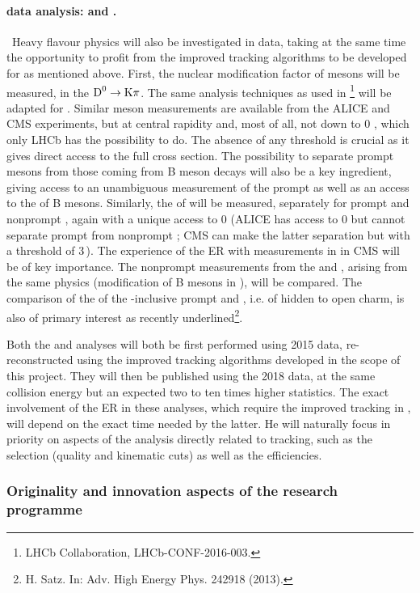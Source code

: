 \documentclass[a4paper,11pt]{article}
\newcommand{\ER}{ER\xspace}
\begin{document}
\paragraph{\pbpb data analysis: \Dz and \Jpsi. }\ 
Heavy flavour physics will also be investigated in \pbpb data, taking at the same time the opportunity to profit from the improved tracking algorithms to be developed for \pbpb as mentioned above. 
%
First, the nuclear modification factor of \Dz mesons will be measured, in the $\text{D}^0 \to \text{K}\pi$. The same analysis techniques as used in \pPb\footnote{LHCb Collaboration, LHCb-CONF-2016-003.} will be adapted for \pbpb. Similar \Dz meson measurements are available from the ALICE and CMS experiments, but at central rapidity and, most of all, not down to 0 \pt, which only LHCb has the possibility to do. The absence of any \pt threshold is crucial as it gives direct access to the full cross section. The possibility to separate
prompt \Dz mesons from those coming from B meson decays will also be a key ingredient, giving access to an unambiguous measurement of the prompt \Dz as well as an access to the \raa
of B mesons.
%
Similarly, the \raa of \Jpsi will be measured, separately for prompt and nonprompt \Jpsi, again with a unique access to 0 \pt (ALICE has access to 0 \pt \Jpsi but cannot separate prompt from nonprompt \Jpsi; CMS can make the latter separation but with a \pt threshold of 3\,\GeVc). The experience of the \ER with \Jpsi measurements in \pbpb
in CMS will be of key importance. The nonprompt measurements from the \Dz and \Jpsi, arising from the same physics (modification of B mesons in \pbpb), will be compared. The comparison of the \raa of the \pt-inclusive prompt \Jpsi and \Dz, i.e. of hidden to open charm, is also of primary interest as recently underlined\footnote{H. Satz. In: Adv. High Energy Phys. 242918 (2013).}.

Both the \Dz and \Jpsi analyses will both be first performed using 2015 \pbpb data, re-reconstructed using the improved tracking algorithms developed in the scope of this project. They will then be published using the 2018 data, at the same collision energy but an expected two to ten times higher statistics. The exact involvement of the \ER in these analyses, which require the improved tracking in \pbpb, will depend on the exact time needed by the latter. He will naturally focus in priority on aspects of the analysis directly related to tracking, such as the selection (quality and kinematic cuts) as well as the efficiencies.


\subsubsection{Originality and innovation aspects of the research programme}
\end{document}
